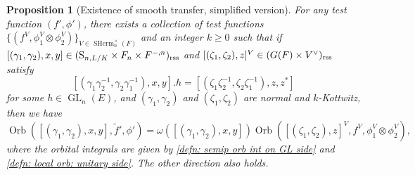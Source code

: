 \documentclass[11pt, reqno]{amsart}
\numberwithin{equation}{subsection}
\theoremstyle{plain}
\newtheorem{proposition}{Proposition}[subsection]
\theoremstyle{definition}
\newcommand{\wt}{\widetilde}
\renewcommand{\S}{\textnormal{S}}
\DeclareMathOperator{\GL}{GL}
\DeclareMathOperator{\Orb}{Orb}
\DeclareMathOperator{\SHerm}{SHerm}
\newcommand{\rss}{\textnormal{rss}}
\begin{document}
\begin{proposition}[Existence of smooth transfer, 
simplified version]
\label{prop:Ksplittransfer}
For any test function $(f', \phi')$,
there exists a collection of test functions 
$\{(f^V, \phi_1^V \otimes \phi_2^V)\}_{V \in \SHerm_n^\times(F)}$
and an integer  $k \ge 0$ such that if 
$[(\gamma_1, \gamma_2), x, y] \in 
(\S_{n, L/K} \times F_n \times F^{-,n})_\rss$ and
$[(\zeta_1, \zeta_2), z]^V \in (G(F) \times V^\vee)_\rss$ 
satisfy
\[
    [(\gamma_1 \gamma_2^{-1}, 
    \gamma_2 \gamma_1^{-1}), x, y].h
    = [(\zeta_1 \zeta_2^{-1}, \zeta_2 \zeta_1^{-1}), 
    z, z^\ast]
\]
for some $h \in \GL_n(E)$, and $(\gamma_1, \gamma_2)$ 
and $(\zeta_1, \zeta_2)$ are normal and $k$-Kottwitz,
then we have
\begin{equation}
\label{eq:transferexistence}
    \Orb([(\gamma_1, \gamma_2), x, y], \wt f', \phi')
    = \omega([(\gamma_1, \gamma_2), x, y])
    \Orb([(\zeta_1, \zeta_2), z]^V, f^V, \phi_1^V \otimes \phi_2^V),
\end{equation}
where the orbital integrals are given by
\eqref{defn: semip orb int on GL side} and
\eqref{defn: local orb: unitary side}.
The other direction also holds.
\end{proposition}
\end{document}
